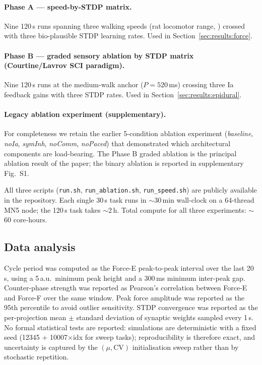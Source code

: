 \paragraph{Phase A --- speed-by-STDP matrix.}
Nine 120\,s runs spanning three walking speeds (rat locomotor range,
\cite{lavrov2008,courtine2009}) crossed with three bio-plausible STDP
learning rates. Used in Section~\ref{sec:results:force}.


\paragraph{Phase B --- graded sensory ablation by STDP matrix
(Courtine/Lavrov SCI paradigm).}
Nine 120\,s runs at the medium-walk anchor ($P=520$\,ms) crossing three
Ia feedback gains with three STDP rates. Used in
Section~\ref{sec:results:epidural}.


\paragraph{Legacy ablation experiment (supplementary).}
For completeness we retain the earlier 5-condition ablation experiment
(\emph{baseline}, \emph{noIa}, \emph{symInh}, \emph{noComm},
\emph{noPaced}) that demonstrated which architectural components are
load-bearing. The Phase B graded ablation is the principal ablation
result of the paper; the binary ablation is reported in supplementary
Fig.~S1.

\noindent All three scripts (\texttt{run.sh}, \texttt{run\_ablation.sh},
\texttt{run\_speed.sh}) are publicly available in the repository. Each
single 30\,s task runs in $\sim$30\,min wall-clock on a 64-thread MN5
node; the 120\,s task takes $\sim$2\,h. Total compute for all three
experiments: $\sim$60 core-hours.

\subsection{Data analysis}\label{sec:methods:analysis}
Cycle period was computed as the Force-E peak-to-peak interval over the
last 20\,s, using a 5\,a.u.\ minimum peak height and a 300\,ms minimum
inter-peak gap. Counter-phase strength was reported as Pearson's
correlation between Force-E and Force-F over the same window. Peak
force amplitude was reported as the 95th percentile to avoid outlier
sensitivity. STDP convergence was reported as the per-projection mean
$\pm$ standard deviation of synaptic weights sampled every 1\,s. No
formal statistical tests are reported: simulations are deterministic with
a fixed seed (12345 + 10007$\times$idx for sweep tasks); reproducibility
is therefore exact, and uncertainty is captured by the $(\mu,\text{CV})$
initialisation sweep rather than by stochastic repetition.

